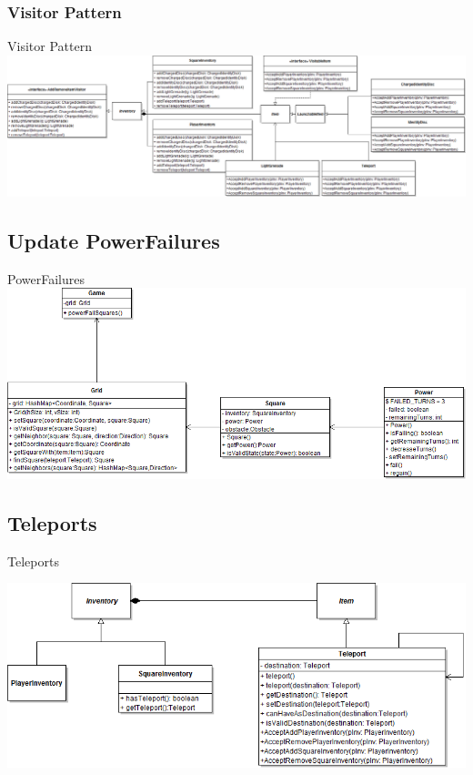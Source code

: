 \documentclass[t]{beamer}
\begin{document}
\subsubsection{Visitor Pattern}
\begin{frame}{Visitor Pattern}
\vspace{0.4in}
\includegraphics[width=1\linewidth]{images/Visitor2}

\end{frame}

\subsection{Update PowerFailures}
\begin{frame}{PowerFailures}
\vspace{0.4in}
\includegraphics[width=1\linewidth]{images/powerfails}


\end{frame}

\subsection{Teleports}
\begin{frame}{Teleports}
\begin{center}
\vspace{0.4in}
\includegraphics[width=1\linewidth]{images/teleports}
\end{center}
\end{frame}
\end{document}
